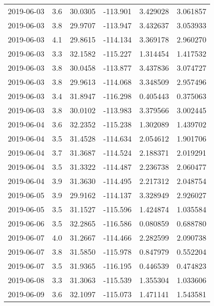 \begin{tabular}{lrrrrr}
2019-06-03 &       3.6 &  30.0305 &  -113.901 &         3.429028 &         3.061857 \\
2019-06-03 &       3.8 &  29.9707 &  -113.947 &         3.432637 &         3.053933 \\
2019-06-03 &       4.1 &  29.8615 &  -114.134 &         3.369178 &         2.960270 \\
2019-06-03 &       3.3 &  32.1582 &  -115.227 &         1.314454 &         1.417532 \\
2019-06-03 &       3.8 &  30.0458 &  -113.877 &         3.437836 &         3.074727 \\
2019-06-03 &       3.8 &  29.9613 &  -114.068 &         3.348509 &         2.957496 \\
2019-06-03 &       3.4 &  31.8947 &  -116.298 &         0.405443 &         0.375063 \\
2019-06-03 &       3.8 &  30.0102 &  -113.983 &         3.379566 &         3.002445 \\
2019-06-04 &       3.6 &  32.2352 &  -115.238 &         1.302089 &         1.439702 \\
2019-06-04 &       3.5 &  31.4528 &  -114.634 &         2.054612 &         1.901706 \\
2019-06-04 &       3.7 &  31.3687 &  -114.524 &         2.188371 &         2.019291 \\
2019-06-04 &       3.5 &  31.3322 &  -114.487 &         2.236738 &         2.060477 \\
2019-06-04 &       3.9 &  31.3630 &  -114.495 &         2.217312 &         2.048754 \\
2019-06-05 &       3.9 &  29.9162 &  -114.137 &         3.328949 &         2.926027 \\
2019-06-05 &       3.5 &  31.1527 &  -115.596 &         1.424874 &         1.035584 \\
2019-06-06 &       3.5 &  32.2865 &  -116.586 &         0.080859 &         0.688780 \\
2019-06-07 &       4.0 &  31.2667 &  -114.466 &         2.282599 &         2.090738 \\
2019-06-07 &       3.8 &  31.5850 &  -115.978 &         0.847979 &         0.552204 \\
2019-06-07 &       3.5 &  31.9365 &  -116.195 &         0.446539 &         0.474823 \\
2019-06-08 &       3.3 &  31.3063 &  -115.539 &         1.355304 &         1.033606 \\
2019-06-09 &       3.6 &  32.1097 &  -115.073 &         1.471141 &         1.543581 \\

\end{tabular}
